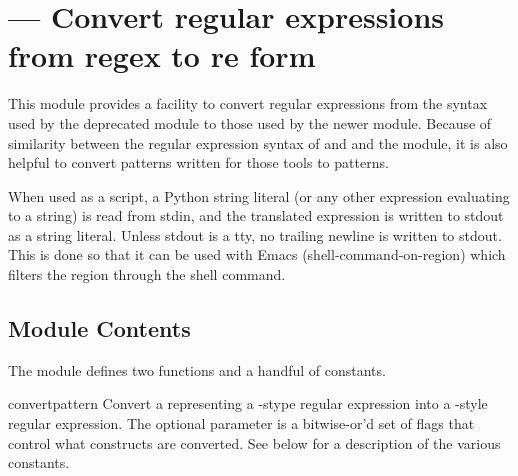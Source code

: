 \section{ ---
         Convert regular expressions from regex to re form}




This module provides a facility to convert regular expressions from the
syntax used by the deprecated  module to those used by the
newer  module.  Because of similarity between the regular
expression syntax of  and  and the
 module, it is also helpful to convert patterns written for
those tools to  patterns.

When used as a script, a Python string literal (or any other expression
evaluating to a string) is read from stdin, and the translated expression is
written to stdout as a string literal.  Unless stdout is a tty, no trailing
newline is written to stdout.  This is done so that it can be used with
Emacs  (shell-command-on-region) which filters the region
through the shell command.

\begin{seealso}
\end{seealso}

\subsection{Module Contents}

The module defines two functions and a handful of constants.

\begin{funcdesc}{convert}{pattern}
 Convert a  representing a -stype regular
 expression into a -style regular expression.  The optional
  parameter is a bitwise-or'd set of flags that control what
 constructs are converted.  See below for a description of the various
 constants.
\end{funcdesc}

